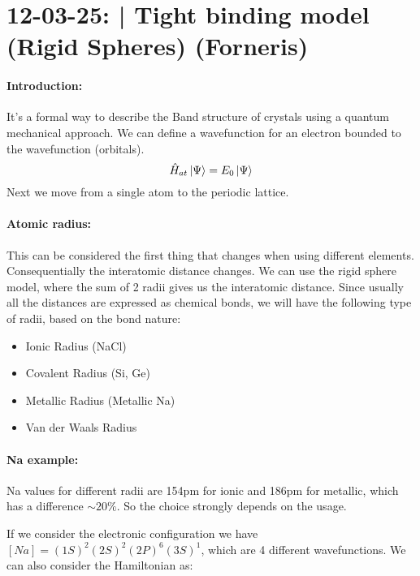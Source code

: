 \section{12-03-25: | Tight binding model (Rigid Spheres) (Forneris)}

\paragraph{Introduction:}It's a formal way to describe the Band structure of crystals using a quantum mechanical approach. We can define a wavefunction for an electron bounded to the wavefunction (orbitals).
\begin{equation}
    \hat{H}_{at} \ket{\Psi} = E_0 \ket{\Psi}
\end{equation}
Next we move from a single atom to the periodic lattice.

\paragraph{Atomic radius:} This can be considered the first thing that changes when using different elements. Consequentially the interatomic distance changes. We can use the rigid sphere model, where the sum of 2 radii gives us the interatomic distance. Since usually all the distances are expressed as chemical bonds, we will have the following type of radii, based on the bond nature:
\begin{itemize}
    \item Ionic Radius (NaCl)
    \item Covalent Radius (Si, Ge)
    \item Metallic Radius (Metallic Na)
    \item Van der Waals Radius 
\end{itemize}

\paragraph{Na example:}
Na values for different radii are 154pm for ionic and 186pm for metallic, which has a difference $\sim 20\%$. So the choice strongly depends on the usage.

If we consider the electronic configuration we have $[Na] = (1S)^2(2S)^2(2P)^6(3S)^1$, which are 4 different wavefunctions. We can also consider the Hamiltonian as:


